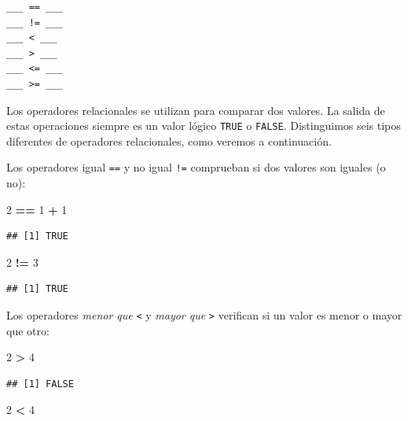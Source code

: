 \documentclass[
]{book}
\newenvironment{Shaded}{\begin{snugshade}}{\end{snugshade}}
\newcommand{\DecValTok}[1]{\textcolor[rgb]{0.00,0.00,0.81}{#1}}
\newcommand{\OperatorTok}[1]{\textcolor[rgb]{0.81,0.36,0.00}{\textbf{#1}}}
\newcommand{\StringTok}[1]{\textcolor[rgb]{0.31,0.60,0.02}{#1}}
\begin{document}
\begin{verbatim}
___ == ___
___ != ___
___ < ___
___ > ___
___ <= ___
___ >= ___
\end{verbatim}

Los operadores relacionales se utilizan para comparar dos valores. La salida de estas operaciones siempre es un valor lógico \texttt{TRUE} o \texttt{FALSE}. Distinguimos seis tipos diferentes de operadores relacionales, como veremos a continuación.

Los operadores igual \texttt{==} y no igual \texttt{!=} comprueban si dos valores son iguales (o no):

\begin{Shaded}
\begin{Highlighting}[]
\DecValTok{2} \OperatorTok{==}\StringTok{ }\DecValTok{1} \OperatorTok{+}\StringTok{ }\DecValTok{1}
\end{Highlighting}
\end{Shaded}

\begin{verbatim}
## [1] TRUE
\end{verbatim}

\begin{Shaded}
\begin{Highlighting}[]
\DecValTok{2} \OperatorTok{!=}\StringTok{ }\DecValTok{3}
\end{Highlighting}
\end{Shaded}

\begin{verbatim}
## [1] TRUE
\end{verbatim}

Los operadores \emph{menor que} \texttt{\textless{}} y \emph{mayor que} \texttt{\textgreater{}} verifican si un valor es menor o mayor que otro:

\begin{Shaded}
\begin{Highlighting}[]
\DecValTok{2} \OperatorTok{>}\StringTok{ }\DecValTok{4}
\end{Highlighting}
\end{Shaded}

\begin{verbatim}
## [1] FALSE
\end{verbatim}

\begin{Shaded}
\begin{Highlighting}[]
\DecValTok{2} \OperatorTok{<}\StringTok{ }\DecValTok{4}
\end{Highlighting}
\end{Shaded}
\end{document}
